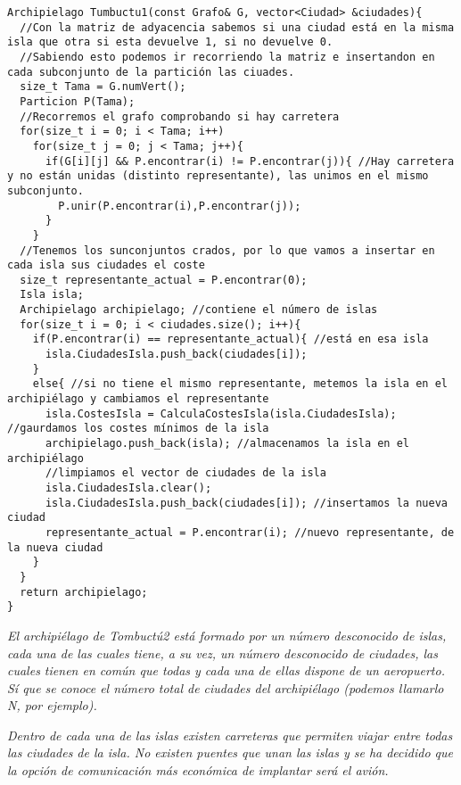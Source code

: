 \begin{verbatim}
Archipielago Tumbuctu1(const Grafo& G, vector<Ciudad> &ciudades){
  //Con la matriz de adyacencia sabemos si una ciudad está en la misma isla que otra si esta devuelve 1, si no devuelve 0.
  //Sabiendo esto podemos ir recorriendo la matriz e insertandon en cada subconjunto de la partición las ciuades.
  size_t Tama = G.numVert();
  Particion P(Tama);
  //Recorremos el grafo comprobando si hay carretera
  for(size_t i = 0; i < Tama; i++)
    for(size_t j = 0; j < Tama; j++){
      if(G[i][j] && P.encontrar(i) != P.encontrar(j)){ //Hay carretera y no están unidas (distinto representante), las unimos en el mismo subconjunto.
        P.unir(P.encontrar(i),P.encontrar(j));
      }
    }
  //Tenemos los sunconjuntos crados, por lo que vamos a insertar en cada isla sus ciudades el coste
  size_t representante_actual = P.encontrar(0);
  Isla isla;
  Archipielago archipielago; //contiene el número de islas
  for(size_t i = 0; i < ciudades.size(); i++){
    if(P.encontrar(i) == representante_actual){ //está en esa isla
      isla.CiudadesIsla.push_back(ciudades[i]);
    }
    else{ //si no tiene el mismo representante, metemos la isla en el archipiélago y cambiamos el representante
      isla.CostesIsla = CalculaCostesIsla(isla.CiudadesIsla); //gaurdamos los costes mínimos de la isla
      archipielago.push_back(isla); //almacenamos la isla en el archipiélago
      //limpiamos el vector de ciudades de la isla
      isla.CiudadesIsla.clear();
      isla.CiudadesIsla.push_back(ciudades[i]); //insertamos la nueva ciudad
      representante_actual = P.encontrar(i); //nuevo representante, de la nueva ciudad      
    }
  }
  return archipielago;
}
\end{verbatim}

\textbf{\large{}}\textit{ El archipiélago de Tombuctú2 está formado por un número desconocido de islas, cada una de las cuales tiene, a su vez, un número desconocido de ciudades, las cuales tienen en común que todas y cada una de ellas dispone de un aeropuerto. Sí que se conoce el número total de ciudades del archipiélago (podemos llamarlo N, por ejemplo).}

\textit{Dentro de cada una de las islas existen carreteras que permiten viajar entre todas las ciudades de la isla. No existen puentes que unan las islas y se ha decidido que la opción de comunicación más económica de implantar será el avión.}

